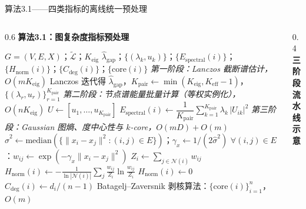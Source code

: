 \documentclass[aspectratio=169,9pt,xcolor=dvipsnames]{beamer}
\newcommand{\blue}[1]{\textcolor{mynavy}{#1}}
\begin{document}
\begin{frame}{算法3.1——四类指标的离线统一预处理}
\begin{columns}[T]

\begin{column}{0.6\textwidth}
  \textbf{\blue{算法3.1：图复杂度指标预处理}}

  \vspace{-2.7pt}
  \small
  \begin{algorithmic}[1]
    \Require $G=(V,E,X)$；$\tilde{\mathcal{L}}$；$K_{\mathrm{eig}}$
    \Ensure $\hat{\lambda}_{\mathrm{gap}}$；$\{(\lambda_k,u_k)\}$；$\{E_{\mathrm{spectral}}(i)\}$；$\{H_{\mathrm{norm}}(i)\}$；$\{C_{\mathrm{deg}}(i)\}$；$\{\mathrm{core}(i)\}$
    \State \textit{第一阶段：Lanczos 截断谱估计，$O(mK_{\mathrm{eig}})$}
    \State Lanczos 迭代得 $\hat{\lambda}_{\mathrm{gap}}$，$K_{\mathrm{pair}}\leftarrow\min(K_{\mathrm{eig}},K_{\mathrm{eff}}{-}1)$，$\{(\lambda_r,u_r)\}_{r=1}^{K_{\mathrm{pair}}}$
    \State \textit{第二阶段：节点谱能量批量计算（等权实例化），$O(nK_{\mathrm{eig}})$}
    \State $U\leftarrow[u_1,\ldots,u_{K_{\mathrm{pair}}}]$
      \State $E_{\mathrm{spectral}}(i)\leftarrow\dfrac{1}{K_{\mathrm{pair}}}\displaystyle\sum_{k=1}^{K_{\mathrm{pair}}}\lambda_k\,|U_{ik}|^2$
    \EndFor
    \State \textit{第三阶段：Gaussian 图熵、度中心性与 $k$-core，$O(mD){+}O(m)$}
    \State $\hat{\sigma}^2\leftarrow\mathrm{median}(\{\|x_i-x_j\|^2:(i,j)\in E\})$；$\gamma_x\leftarrow1/(2\hat{\sigma}^2)$
    \State $\forall(i,j)\in E$：$w_{ij}\leftarrow\exp(-\gamma_x\|x_i-x_j\|^2)$
      \State $Z_i\leftarrow\sum_{j\in\mathcal{N}(i)}w_{ij}$
      \enspace $H_{\mathrm{norm}}(i)\leftarrow{-}\tfrac{1}{\ln|\mathcal{N}(i)|}\sum_{j}\tfrac{w_{ij}}{Z_i}\ln\tfrac{w_{ij}}{Z_i}$
      \Else\enspace $H_{\mathrm{norm}}(i)\leftarrow 0$
      \EndIf
      \State $C_{\mathrm{deg}}(i)\leftarrow d_i/(n-1)$
    \EndFor
    \State Batagelj--Zaversnik 剥核算法：$\{\mathrm{core}(i)\}_{i=1}^n$，$O(m)$
  \end{algorithmic}
\end{column}

\begin{column}{0.4\textwidth}
  \textbf{\blue{三阶段流水线示意}}


\end{column}
\end{columns}
\end{frame}
\end{document}
